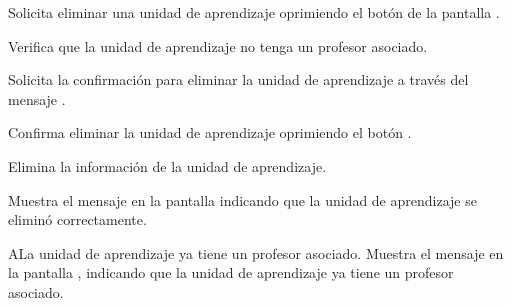 \begin{UCtrayectoria}
	\UCpaso [\UCactor] Solicita eliminar una unidad de aprendizaje oprimiendo el botón  de la pantalla .
	
	\UCpaso [\UCsist] Verifica que la unidad de aprendizaje no tenga un profesor asociado. 
		
	\UCpaso [\UCsist] Solicita la confirmación para eliminar la unidad de aprendizaje a través del mensaje .
	
	\UCpaso [\UCactor] Confirma eliminar la unidad de aprendizaje oprimiendo el botón .
	
	\UCpaso [\UCsist] Elimina la información de la unidad de aprendizaje.
	
	\UCpaso [\UCsist] Muestra el mensaje  en la pantalla  indicando que la unidad de aprendizaje se eliminó correctamente.	
	
\end{UCtrayectoria}

\begin{UCtrayectoriaA}{A}{La unidad de aprendizaje ya tiene un profesor asociado.}
	\UCpaso [\UCsist] Muestra el mensaje  en la pantalla , indicando que la unidad de aprendizaje ya tiene un profesor asociado. 
\end{UCtrayectoriaA}

